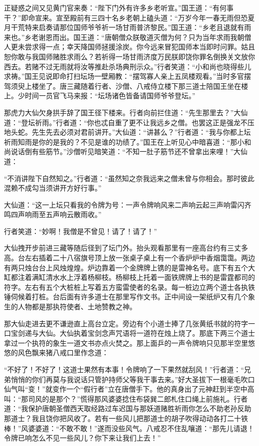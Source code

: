 \documentclass[12pt,UTF8]{ctexbook}
\begin{document}
正疑惑之间又见黄门官来奏：“陛下门外有许多乡老听宣。”国王道：“有何事干？”即命宣来。宣至殿前有三四十名乡老朝上磕头道：“万岁今年一春无雨但恐夏月干荒特来启奏请那位国师爷爷祈一场甘雨普济黎民。”国王道：“乡老且退就有雨来也。”乡老谢恩而出。国王道：“唐朝僧众朕敬道灭僧为何？只为当年求雨我朝僧人更未尝求得一点；幸天降国师拯援涂炭。你今远来冒犯国师本当即时问罪。姑且恕你敢与我国师赌胜求雨么？若祈得一场甘雨济度万民朕即饶你罪名倒换关文放你西去。若赌不过无雨就将汝等推赴杀场典刑示众。”行者笑道：“小和尚也晓得些儿求祷。”国王见说即命打扫坛场一壁厢教：“摆驾寡人亲上五凤楼观看。”当时多官摆驾须臾上楼坐了。唐三藏随着行者、沙僧、八戒侍立楼下那三道士陪国王坐在楼上。少时间一员官飞马来报：“坛场诸色皆备请国师爷爷登坛。”

那虎力大仙欠身拱手辞了国王径下楼来。行者向前拦住道：“先生那里去？”大仙道：“登坛祈雨。”行者道：“你也忒自重了更不让我远乡之僧。也罢这正是强龙不压地头蛇。先生先去必须对君前讲开。”大仙道：“讲甚么？”行者道：“我与你都上坛祈雨知雨是你的是我的？不见是谁的功绩了。”国王在上听见心中暗喜道：“那小和尚说话倒有些筋节。”沙僧听见暗笑道：“不知一肚子筋节还不曾拿出来哩！”大仙道：

“不消讲陛下自然知之。”行者道：“虽然知之奈我远来之僧未曾与你相会。那时彼此混赖不成勾当须讲开方好行事。”

大仙道：“这一上坛只看我的令牌为号：一声令牌响风来二声响云起三声响雷闪齐鸣四声响雨至五声响云散雨收。”

行者笑道：“妙啊！我僧是不曾见！请了！请了！”

大仙拽开步前进三藏等随后径到了坛门外。抬头观看那里有一座高台约有三丈多高。台左右插着二十八宿旗号顶上放一张桌子桌上有一个香炉炉中香烟霭霭。两边有两只烛台台上风烛煌煌。炉边靠着一个金牌牌上镌的是雷神名号。底下有五个大缸都注着满缸清水水上浮着杨柳枝。杨柳枝上托着一面铁牌牌上书的是雷霆都司的符字。左右有五个大桩桩上写着五方蛮雷使者的名录。每一桩边立两个道士各执铁锤伺候着打桩。台后面有许多道士在那里写作文书。正中间设一架纸炉又有几个象生的人物都是那执符使者、土地赞教之神。

那大仙走进去更不谦逊直上高台立定。旁边有个小道士捧了几张黄纸书就的符字一口宝剑递与大仙。大仙执着宝剑念声咒语将一道符在烛上烧了。那底下两三个道士拿过一个执符的象生一道文书亦点火焚之。那上面乒的一声令牌响只见那半空里悠悠的风色飘来猪八戒口里作念道：

“不好了！不好了！这道士果然有本事！令牌响了一下果然就刮风！”行者道：“兄弟悄悄的你们再莫与我说话只管护持师父等我干事去来。”好大圣拔下一根毫毛吹口仙气叫“变！”就变作一个“假行者”立在唐僧手下。他的真身出了元神赶到半空中高叫：“那司风的是那个？”慌得那风婆婆捻住布袋巽二郎札住口绳上前施礼。行者道：“我保护唐朝圣僧西天取经路过车迟国与那妖道赌胜祈雨你怎么不助老孙反助那道士？我且饶你把风收了。若有一些风儿把那道士的胡子吹得动动各打二十铁棒！”风婆婆道：“不敢不敢！”遂而没些风气。八戒忍不住乱嚷道：“那先儿请退！令牌已响怎么不见一些风儿？你下来让我们上去！”
\end{document}
